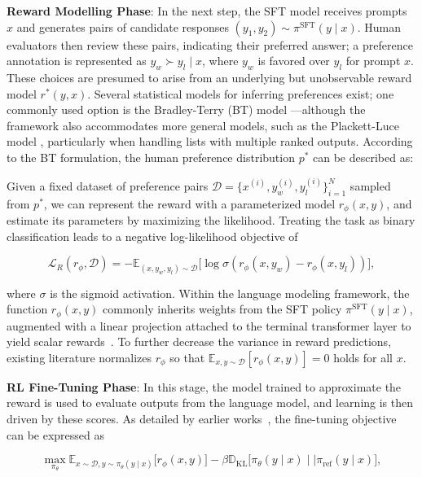 \textbf{Reward Modelling Phase}: In the next step, the SFT model receives prompts $x$ and generates pairs of candidate responses $(y_1, y_2)\sim \pi^\text{SFT}(y \mid x)$. Human evaluators then review these pairs, indicating their preferred answer; a preference annotation is represented as $y_w\succ y_l \mid x$, where $y_w$ is favored over $y_l$ for prompt $x$. These choices are presumed to arise from an underlying but unobservable reward model $r^*(y, x)$. Several statistical models for inferring preferences exist; one commonly used option is the Bradley-Terry (BT) model \cite{bradley1952rankanalysis}—although the framework also accommodates more general models, such as the Plackett-Luce model \citep{plackett1975analysis, luce2012individual}, particularly when handling lists with multiple ranked outputs. According to the BT formulation, the human preference distribution $p^*$ can be described as:

Given a fixed dataset of preference pairs $\mathcal{D}=\bigl\{x^{(i)}, y_w^{(i)}, y_l^{(i)}\bigr\}_{i=1}^N$ sampled from $p^*$, we can represent the reward with a parameterized model $r_{\phi}(x, y)$, and estimate its parameters by maximizing the likelihood. Treating the task as binary classification leads to a negative log-likelihood objective of

\begin{equation}\label{eq:reward_model}
    \mathcal{L}_R(r_{\phi}, \mathcal{D}) = -\mathbb{E}_{(x, y_w, y_l)\sim \mathcal{D}}\bigl[\log \sigma(r_{\phi}(x, y_w)- r_{\phi}(x, y_l))\bigr],
\end{equation}

where $\sigma$ is the sigmoid activation. Within the language modeling framework, the function $r_{\phi}(x, y)$ commonly inherits weights from the SFT policy $\pi^\text{SFT}(y \mid x)$, augmented with a linear projection attached to the terminal transformer layer to yield scalar rewards~\cite{ziegler2020finetuning}. To further decrease the variance in reward predictions, existing literature normalizes $r_\phi$ so that $\mathbb{E}_{x,y\sim \mathcal{D}}\left[r_\phi(x, y)\right] = 0$ holds for all $x$.

\textbf{RL Fine-Tuning Phase}: In this stage, the model trained to approximate the reward is used to evaluate outputs from the language model, and learning is then driven by these scores. As detailed by earlier works~\citep{jaques2017sequence, jaques2020human}, the fine-tuning objective can be expressed as

\begin{equation}\label{eq:RL}
\max_{\pi_{\theta}}  \mathbb{E}_{x\sim \mathcal{D}, y\sim \pi_{\theta}(y \mid x)}\bigl[r_{\phi}(x, y)\bigr] - \beta\mathbb{D}_{\textrm{KL}}\bigl[\pi_{\theta}(y\mid x)\mid \mid \pi_\text{ref}(y\mid x)\bigr],
\end{equation}

